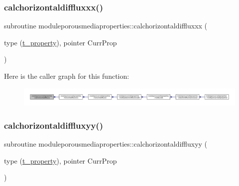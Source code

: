 \subsubsection{\texorpdfstring{calchorizontaldiffluxxx()}{calchorizontaldiffluxxx()}}
{\footnotesize\ttfamily subroutine moduleporousmediaproperties\+::calchorizontaldiffluxxx (\begin{DoxyParamCaption}\item[{type (\mbox{\hyperlink{structmoduleporousmediaproperties_1_1t__property}{t\+\_\+property}}), pointer}]{Curr\+Prop }\end{DoxyParamCaption})\hspace{0.3cm}{\ttfamily [private]}}

Here is the caller graph for this function\+:\nopagebreak
\begin{figure}[H]
\begin{center}
\leavevmode
\includegraphics[width=350pt]{namespacemoduleporousmediaproperties_ac3477d319b62465ddf85f06d31d2310b_icgraph}
\end{center}
\end{figure}
\mbox{\label{namespacemoduleporousmediaproperties_a060f429ecbcbfc17419b00ac5e09e9de}} 
\subsubsection{\texorpdfstring{calchorizontaldiffluxyy()}{calchorizontaldiffluxyy()}}
{\footnotesize\ttfamily subroutine moduleporousmediaproperties\+::calchorizontaldiffluxyy (\begin{DoxyParamCaption}\item[{type (\mbox{\hyperlink{structmoduleporousmediaproperties_1_1t__property}{t\+\_\+property}}), pointer}]{Curr\+Prop }\end{DoxyParamCaption})\hspace{0.3cm}{\ttfamily [private]}}

